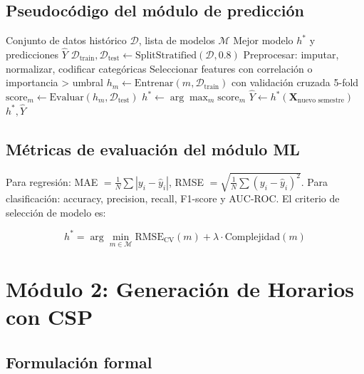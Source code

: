 \documentclass[12pt,twoside]{report}
\theoremstyle{definition}
\begin{document}
\subsection{Pseudoc\'odigo del m\'odulo de predicci\'on}

\begin{algorithm}[H]
\caption{Entrenamiento y evaluaci\'on del m\'odulo de predicci\'on}
\label{alg:ml}
\begin{algorithmic}[1]
\Require Conjunto de datos hist\'orico $\mathcal{D}$, lista de modelos $\mathcal{M}$
\Ensure Mejor modelo $h^*$ y predicciones $\hat{Y}$
\State $\mathcal{D}_{\text{train}}, \mathcal{D}_{\text{test}} \leftarrow \text{SplitStratified}(\mathcal{D}, 0.8)$
\State Preprocesar: imputar, normalizar, codificar categ\'oricas
\State Seleccionar features con correlaci\'on o importancia > umbral
  \State $h_m \leftarrow \text{Entrenar}(m, \mathcal{D}_{\text{train}})$ con validaci\'on cruzada 5-fold
  \State $\text{score}_m \leftarrow \text{Evaluar}(h_m, \mathcal{D}_{\text{test}})$
\EndFor
\State $h^* \leftarrow \arg\max_{m} \text{score}_m$
\State $\hat{Y} \leftarrow h^*(\mathbf{X}_{\text{nuevo semestre}})$
\Return $h^*, \hat{Y}$
\end{algorithmic}
\end{algorithm}

\subsection{M\'etricas de evaluaci\'on del m\'odulo ML}

Para regresi\'on: MAE $= \frac{1}{N}\sum|y_i - \hat{y}_i|$,
RMSE $= \sqrt{\frac{1}{N}\sum(y_i-\hat{y}_i)^2}$.
Para clasificaci\'on: accuracy, precision, recall, F1-score y AUC-ROC.
El criterio de selecci\'on de modelo es:

\begin{equation}
  h^* = \arg\min_{m \in \mathcal{M}} \text{RMSE}_{\text{CV}}(m) + \lambda \cdot \text{Complejidad}(m)
  \label{eq:model_sel}
\end{equation}

\section{M\'odulo 2: Generaci\'on de Horarios con CSP}

\subsection{Formulaci\'on formal}
\end{document}

